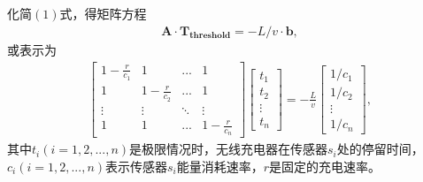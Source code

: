 \documentclass{whutmod}
\begin{document}
\begin{table}[H]
\begin{tablenotes}
		化简$(1)$式，得矩阵方程
		\begin{gather}
		\bm A \cdot \bm{T_{threshold}}=-L/v \cdot \bm b,
		\end{gather}
		或表示为
		\begin{gather}
		\begin{bmatrix}
		1-\frac{r}{c_1} & 1 & ... & 1 \\ 
		1 & 1-\frac{r}{c_2} & ... & 1\\ 
		\vdots  & \vdots & \ddots  & \vdots \\ 
		1 & 1 & ... & 1-\frac{r}{c_n}
		\end{bmatrix}\begin{bmatrix}
		t_1\\ t_2\\ \vdots\\ t_n
		\end{bmatrix}=-\frac{L}{v}
		\begin{bmatrix}
		1/c_1\\ 1/c_2\\ \vdots\\ 1/c_n
		\end{bmatrix},
		\end{gather}
		其中$t_i(i=1,2,...,n)$是极限情况时，无线充电器在传感器$s_i$处的停留时间，$c_i(i=1,2,...,n)$表示传感器$s_i$能量消耗速率，$r$是固定的充电速率。
		

\end{tablenotes}
\end{table}
\end{document}

